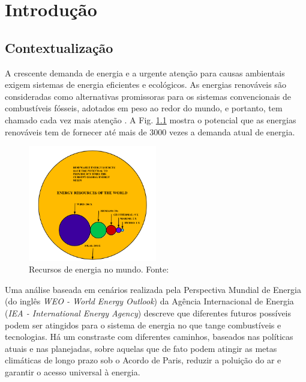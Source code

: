 \chapter [Introdução]{Introdução}

\section{Contextualização}


A crescente demanda de energia e a urgente atenção para causas ambientais exigem sistemas de energia eficientes e ecológicos. 
As energias renováveis são consideradas como alternativas promissoras para os sistemas convencionais de combustíveis fósseis, adotados em peso ao redor do mundo, e portanto, tem chamado cada vez mais atenção \cite{Guo2018}.
A Fig. \ref{fig:energy-resources} mostra o potencial que as energias renováveis tem de fornecer até mais de 3000 vezes a demanda atual de energia.

\begin{figure}[!hbt]
	\begin{center}
    \includegraphics[width=0.5\textwidth]{figuras/Energy_Resources_of_The_World.png}
    \caption{Recursos de energia no mundo. Fonte: \cite{Ellabban2014}}
    \label{fig:energy-resources}
    \end{center}
\end{figure}

Uma análise baseada em cenários realizada pela Perspectiva Mundial de Energia (do inglês \textit{WEO - World Energy Outlook}) da Agência Internacional de Energia (\textit{IEA - International Energy Agency}) descreve que diferentes futuros possíveis podem ser atingidos para o sistema de energia no que tange combustíveis e tecnologias.
Há um constraste com diferentes caminhos, baseados nas políticas atuais e nas planejadas, sobre aquelas que de fato podem atingir as metas climáticas de longo prazo sob o Acordo de Paris, reduzir a poluição do ar e garantir o acesso universal à energia. 

